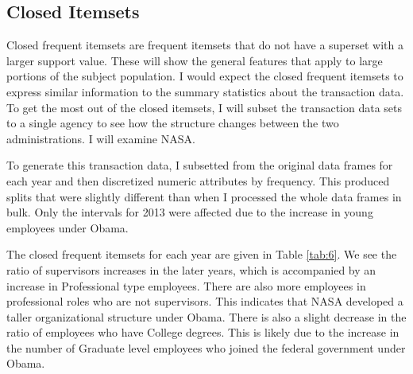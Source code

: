 \documentclass{article}
\begin{document}
    \subsection{Closed Itemsets}
    Closed frequent itemsets are frequent itemsets that do not have a superset with a larger support value. These will show the general features that apply to large portions of the subject population. I would expect the closed frequent itemsets to express similar information to the summary statistics about the transaction data. To get the most out of the closed itemsets, I will subset the transaction data sets to a single agency to see how the structure changes between the two administrations. I will examine NASA.
    \par
    To generate this transaction data, I subsetted from the original data frames for each year and then discretized numeric attributes by frequency. This produced splits that were slightly different than when I processed the whole data frames in bulk. Only the intervals for 2013 were affected due to the increase in young employees under Obama.
    \par
    The closed frequent itemsets for each year are given in Table \ref{tab:6}. We see the ratio of supervisors increases in the later years, which is accompanied by an increase in Professional type employees. There are also more employees in professional roles who are not supervisors. This indicates that NASA developed a taller organizational structure under Obama. There is also a slight decrease in the ratio of employees who have College degrees. This is likely due to the increase in the number of Graduate level employees who joined the federal government under Obama.
\end{document}
